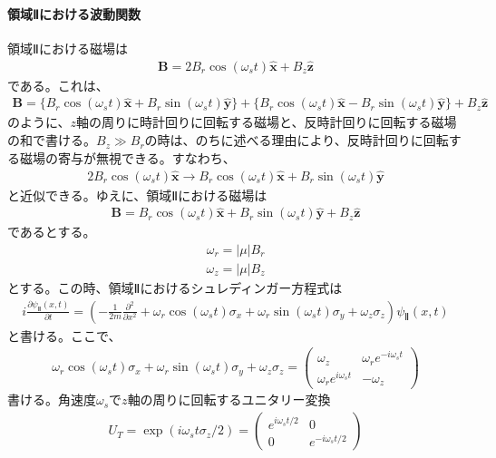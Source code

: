 \paragraph{領域Ⅱにおける波動関数}
領域Ⅱにおける磁場は
\begin{align}
\bm{B}=2B_{r}\cos(\omega_{s}t)\bm{\hat{x}}+B_{z}\bm{\hat{z}}
\end{align}
である。これは、
\begin{align}
\bm{B}=\{B_{r}\cos(\omega_{s}t)\bm{\hat{x}}+B_{r}\sin(\omega_{s}t)\bm{\hat{y}}\}+\{B_{r}\cos(\omega_{s}t)\bm{\hat{x}}-B_{r}\sin(\omega_{s}t)\bm{\hat{y}}\}+B_{z}\bm{\hat{z}}
\end{align}
のように、$z$軸の周りに時計回りに回転する磁場と、反時計回りに回転する磁場の和で書ける。$B_{z} \gg B_{r}$の時は、のちに述べる理由により、反時計回りに回転する磁場の寄与が無視できる。すなわち、
\begin{align}
2B_{r}\cos(\omega_{s}t)\bm{\hat{x}} \to  B_{r}\cos(\omega_{s}t)\bm{\hat{x}}+B_{r}\sin(\omega_{s}t)\bm{\hat{y}}
\end{align}
と近似できる。ゆえに、領域Ⅱにおける磁場は
\begin{align}
\bm{B}=B_{r}\cos(\omega_{s}t)\bm{\hat{x}}+B_{r}\sin(\omega_{s}t)\bm{\hat{y}}+B_{z}\bm{\hat{z}}
\end{align}
であるとする。
\begin{align}
\omega_{r}=|{\mu}|B_{r}
\end{align}
\begin{align}
\omega_{z}=|{\mu}|B_{z}
\end{align}
とする。この時、領域Ⅱにおけるシュレディンガー方程式は
\begin{align}
i\frac{\partial {\psi}_{Ⅱ}(x,t)}{\partial t}=\left(-\frac{1}{2m}\frac{\partial^2}{\partial x^2}+\omega_{r}\cos(\omega_{s}t){\sigma}_{x}+\omega_{r}\sin(\omega_{s}t){\sigma}_{y}+\omega_{z}{\sigma}_{z}\right){\psi}_{Ⅱ}(x,t)
\end{align}
と書ける。ここで、
\begin{align}
\omega_{r}\cos(\omega_{s}t){\sigma}_{x}+\omega_{r}\sin(\omega_{s}t){\sigma}_{y}+\omega_{z}{\sigma}_{z}=
\begin{pmatrix}
\omega_{z} &\omega_{r}e^{-i\omega_{s}t} \\
\omega_{r}e^{i\omega_{s}t} &-\omega_{z}
\end{pmatrix}
\end{align}
書ける。角速度$\omega_{s}$で$z$軸の周りに回転するユニタリー変換
\begin{align}
U_{T}=\exp(i\omega_{s}t{\sigma}_{z}/2)=
\begin{pmatrix}
e^{i\omega_{s}t/2} &0 \\
0 &e^{-i\omega_{s}t/2}
\end{pmatrix}
\end{align}
